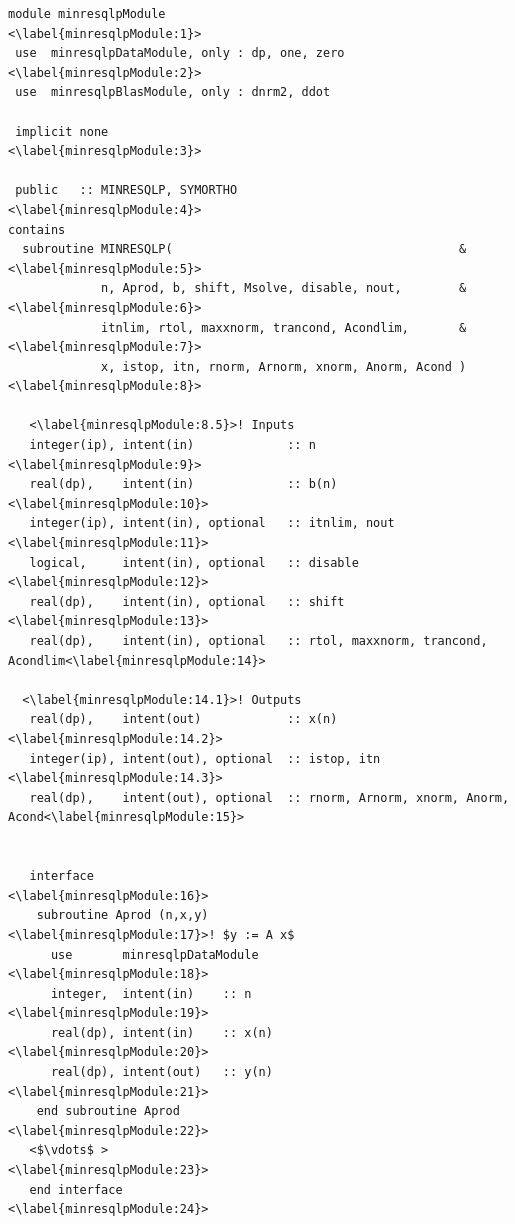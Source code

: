 \documentclass{doc_acmtrans2m}
\begin{document}
 
\begin{lstlisting}[frame=TB,float,caption=Partial code listing of
                   subroutine MINRESQLP in minresqlpModule.,
                   label=code:minresqlpModule,texcl]
module minresqlpModule                                          <\label{minresqlpModule:1}>
 use  minresqlpDataModule, only : dp, one, zero                 <\label{minresqlpModule:2}>
 use  minresqlpBlasModule, only : dnrm2, ddot

 implicit none                                                  <\label{minresqlpModule:3}>

 public   :: MINRESQLP, SYMORTHO                                <\label{minresqlpModule:4}>
contains
  subroutine MINRESQLP(                                        &<\label{minresqlpModule:5}>
             n, Aprod, b, shift, Msolve, disable, nout,        &<\label{minresqlpModule:6}>
             itnlim, rtol, maxxnorm, trancond, Acondlim,       &<\label{minresqlpModule:7}>
             x, istop, itn, rnorm, Arnorm, xnorm, Anorm, Acond )<\label{minresqlpModule:8}>
                      
   <\label{minresqlpModule:8.5}>! Inputs
   integer(ip), intent(in)             :: n                     <\label{minresqlpModule:9}>
   real(dp),    intent(in)             :: b(n)                  <\label{minresqlpModule:10}>
   integer(ip), intent(in), optional   :: itnlim, nout          <\label{minresqlpModule:11}>
   logical,     intent(in), optional   :: disable               <\label{minresqlpModule:12}>
   real(dp),    intent(in), optional   :: shift                 <\label{minresqlpModule:13}>
   real(dp),    intent(in), optional   :: rtol, maxxnorm, trancond, Acondlim<\label{minresqlpModule:14}>
  
  <\label{minresqlpModule:14.1}>! Outputs                                                  
   real(dp),    intent(out)            :: x(n)                  <\label{minresqlpModule:14.2}>
   integer(ip), intent(out), optional  :: istop, itn            <\label{minresqlpModule:14.3}>
   real(dp),    intent(out), optional  :: rnorm, Arnorm, xnorm, Anorm, Acond<\label{minresqlpModule:15}>
  

   interface                                                    <\label{minresqlpModule:16}>
    subroutine Aprod (n,x,y)                    <\label{minresqlpModule:17}>! $y := A x$
      use       minresqlpDataModule             <\label{minresqlpModule:18}>
      integer,  intent(in)    :: n              <\label{minresqlpModule:19}>
      real(dp), intent(in)    :: x(n)           <\label{minresqlpModule:20}>
      real(dp), intent(out)   :: y(n)           <\label{minresqlpModule:21}>
    end subroutine Aprod                        <\label{minresqlpModule:22}>
   <$\vdots$ >                                  <\label{minresqlpModule:23}>
   end interface                                <\label{minresqlpModule:24}>


\end{lstlisting}
\end{document}

